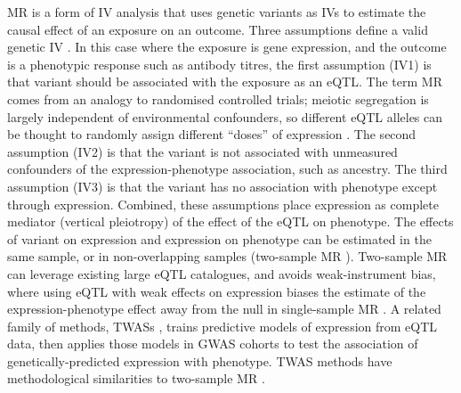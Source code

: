 \gls{MR} is a form of \gls{IV} analysis that uses genetic variants as \glspl{IV} to estimate the causal effect of an exposure on an outcome.
Three assumptions define a valid genetic \gls{IV} \autocite{daveysmith2014MendelianRandomizationGenetic,hemani2018EvaluatingPotentialRole,neumeyer2020StrengtheningCausalInference}.
In this case where the exposure is gene expression, and the outcome is a phenotypic response such as antibody titres,
the first assumption (IV1) is that variant should be associated with the exposure as an \gls{eQTL}.
The term \gls{MR} comes from an analogy to randomised controlled trials;
meiotic segregation is largely independent of environmental confounders, 
so different \gls{eQTL} alleles can be thought to randomly assign different \enquote{doses} of expression \autocite{daveysmith2014MendelianRandomizationGenetic}.
The second assumption (IV2) is that the variant is not associated with unmeasured confounders of the expression-phenotype association, such as ancestry.
The third assumption (IV3) is that the variant has no association with phenotype except through expression. 
Combined, these assumptions place expression as complete mediator (vertical pleiotropy) of the effect of the \gls{eQTL} on phenotype.
The effects of variant on expression and expression on phenotype can be estimated in the same sample, 
or in non-overlapping samples (two-sample \gls{MR} \autocite{hemani2018EvaluatingPotentialRole,neumeyer2020StrengtheningCausalInference}).
Two-sample \gls{MR} can leverage existing large \gls{eQTL} catalogues,
and avoids weak-instrument bias, where using \gls{eQTL} with weak effects on expression biases the estimate of the expression-phenotype effect away from the null in single-sample \gls{MR} \autocite{daveysmith2020MendelLawsMendelian}.
%
A related family of methods,
\glspl{TWAS} \autocite{gusev2016IntegrativeApproachesLargescale},
trains predictive models of expression from \gls{eQTL} data, 
then applies those models in \gls{GWAS} cohorts to test the association of genetically-predicted expression with phenotype.
\gls{TWAS} methods have methodological similarities to two-sample \gls{MR} \autocite{zhu2020TranscriptomewideAssociationStudies}.

